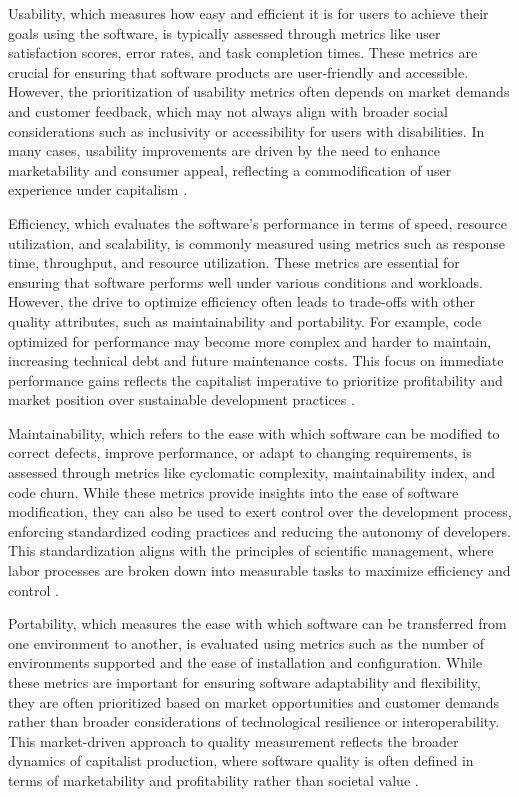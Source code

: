\begin{refsection}
Usability, which measures how easy and efficient it is for users to achieve their goals using the software, is typically assessed through metrics like user satisfaction scores, error rates, and task completion times. These metrics are crucial for ensuring that software products are user-friendly and accessible. However, the prioritization of usability metrics often depends on market demands and customer feedback, which may not always align with broader social considerations such as inclusivity or accessibility for users with disabilities. In many cases, usability improvements are driven by the need to enhance marketability and consumer appeal, reflecting a commodification of user experience under capitalism \cite[pp.~201-204]{Nielsen2006UsabilityEngineering}.

Efficiency, which evaluates the software's performance in terms of speed, resource utilization, and scalability, is commonly measured using metrics such as response time, throughput, and resource utilization. These metrics are essential for ensuring that software performs well under various conditions and workloads. However, the drive to optimize efficiency often leads to trade-offs with other quality attributes, such as maintainability and portability. For example, code optimized for performance may become more complex and harder to maintain, increasing technical debt and future maintenance costs. This focus on immediate performance gains reflects the capitalist imperative to prioritize profitability and market position over sustainable development practices \cite[pp.~87-90]{Sommerville2011SoftwareEngineering}.

Maintainability, which refers to the ease with which software can be modified to correct defects, improve performance, or adapt to changing requirements, is assessed through metrics like cyclomatic complexity, maintainability index, and code churn. While these metrics provide insights into the ease of software modification, they can also be used to exert control over the development process, enforcing standardized coding practices and reducing the autonomy of developers. This standardization aligns with the principles of scientific management, where labor processes are broken down into measurable tasks to maximize efficiency and control \cite[pp.~102-105]{Martin2018CleanArchitecture}.

Portability, which measures the ease with which software can be transferred from one environment to another, is evaluated using metrics such as the number of environments supported and the ease of installation and configuration. While these metrics are important for ensuring software adaptability and flexibility, they are often prioritized based on market opportunities and customer demands rather than broader considerations of technological resilience or interoperability. This market-driven approach to quality measurement reflects the broader dynamics of capitalist production, where software quality is often defined in terms of marketability and profitability rather than societal value \cite[pp.~145-148]{Bass2012SoftwareArchitecture}.


\end{refsection}

